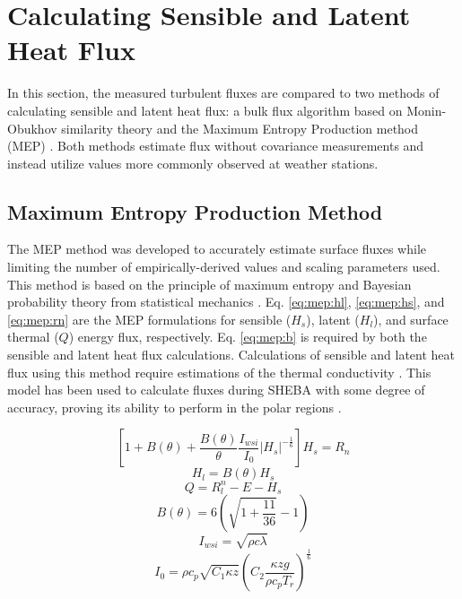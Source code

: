 \section{Calculating Sensible and Latent Heat Flux}
In this section, the measured turbulent fluxes are compared to two methods of calculating sensible and latent heat flux: a bulk flux algorithm based on Monin-Obukhov similarity theory \citep{foken:2008} and the Maximum Entropy Production method (MEP) \citep{zhang:2021, wang:2014, wang:2009}. Both methods estimate flux without covariance measurements and instead utilize values more commonly observed at weather stations.

\subsection{Maximum Entropy Production Method} 
The MEP method was developed to accurately estimate surface fluxes while limiting the number of empirically-derived values and scaling parameters used. This method is based on the principle of maximum entropy and Bayesian probability theory from statistical mechanics \citep{wang:2014}. Eq. \ref{eq:mep:hl}, \ref{eq:mep:hs}, and \ref{eq:mep:rn} are the MEP formulations for sensible ($H_{s}$), latent ($H_{l}$), and surface thermal ($Q$) energy flux, respectively. Eq. \ref{eq:mep:b} is required by both the sensible and latent heat flux calculations. Calculations of sensible and latent heat flux using this method require estimations of the thermal conductivity \citep{wang:2014}. This model has been used to calculate fluxes during SHEBA with some degree of accuracy, proving its ability to perform in the polar regions \citep{wang:2014}.

\begin{equation}\label{eq:mep:rn}
\left[ 1 + B(\theta) + \frac{B(\theta)}{\theta} \frac{I_{wsi}}{I_{0}} | H_{s} | ^{-\frac{1}{6}} \right] H_{s} = R_{n}
\end{equation}
\begin{equation}\label{eq:mep:hl}
H_{l} = B(\theta) H_{s}
\end{equation}
\begin{equation}\label{eq:mep:hs}
Q = R_{l}^{n} - E - H_{s}
\end{equation}
\begin{equation}\label{eq:mep:b}
B(\theta) = 6 \left( \sqrt{1 + \frac{11}{36}} - 1 \right)
\end{equation}
\begin{equation}\label{eq:iwsi}
I_{wsi} = \sqrt{\rho c \lambda}
\end{equation}
\begin{equation}\label{eq:i0}
I_{0} = \rho c_{p} \sqrt{C_{1}\kappa z} \left( C_{2} \frac{\kappa zg}{\rho c_{p} T_{r}} \right)^{\frac{1}{6}}
\end{equation}

